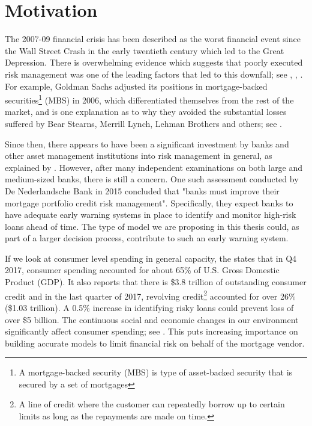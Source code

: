     \section{Motivation}
        The 2007-09 financial crisis has been described as the worst financial event since the Wall Street Crash in the early twentieth century which led to the Great Depression. There is overwhelming evidence which suggests that poorly executed risk management was one of the leading factors that led to this downfall; see \cite{risk_management1}, \cite{risk_management2}, \cite{risk_management3}. For example, Goldman Sachs adjusted its positions in mortgage-backed securities\footnote{A mortgage-backed security (MBS) is type of asset-backed security that is secured by a set of mortgages} (MBS) in 2006, which differentiated themselves from the rest of the market, and is one explanation as to why they avoided the substantial losses suffered by Bear Stearns, Merrill Lynch, Lehman Brothers and others; see \cite{risk_management_lessons}. 
            
        Since then, there appears to have been a significant investment by banks and other asset management institutions into risk management in general, as explained by \cite{risk_management_five_years_on_ey}. However, after many independent examinations on both large and medium-sized banks, there is still a concern. One such assessment conducted by De Nederlandsche Bank in 2015 concluded that "banks must improve their mortgage portfolio credit risk management". Specifically, they expect banks to have adequate early warning systems in place to identify and monitor high-risk loans ahead of time. The type of model we are proposing in this thesis could, as part of a larger decision process, contribute to such an early warning system.  
        
        If we look at consumer level spending in general capacity, the \citeauthor{labor_stats} states that in Q4 2017, consumer spending accounted for about 65\% of U.S. Gross Domestic Product (GDP). It also reports that there is \$3.8 trillion of outstanding consumer credit and in the last quarter of 2017, revolving credit\footnote{A line of credit where the customer can repeatedly borrow up to certain limits as long as the repayments are made on time.} accounted for over 26\% (\$1.03 trillion). A 0.5\% increase in identifying risky loans could prevent loss of over \$5 billion. The continuous social and economic changes in our environment significantly affect consumer spending; see \cite{consumer_spending}. This puts increasing importance on building accurate models to limit financial risk on behalf of the mortgage vendor. 
        
